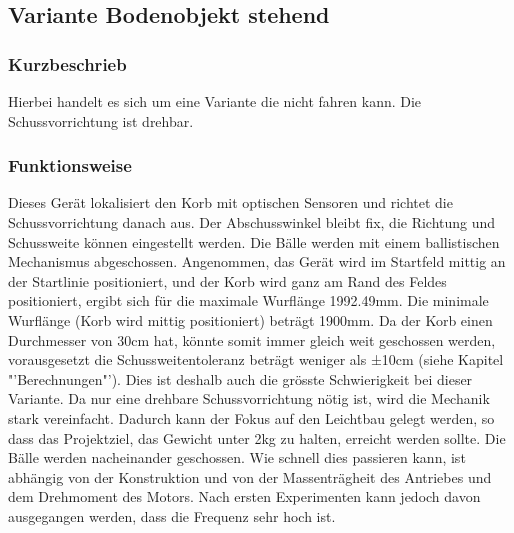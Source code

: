 

\clearpage

\subsection{Variante Bodenobjekt stehend}
\label{sec:var_bod_ste}
\subsubsection{Kurzbeschrieb}
Hierbei handelt es sich um eine Variante die nicht fahren kann. Die Schussvorrichtung ist drehbar.

\subsubsection{Funktionsweise}
Dieses Gerät lokalisiert den Korb mit optischen Sensoren und richtet die 
Schussvorrichtung danach aus. Der Abschusswinkel bleibt fix, die Richtung und 
Schussweite können eingestellt werden. Die Bälle werden mit einem 
ballistischen Mechanismus abgeschossen. Angenommen, das Gerät wird im Startfeld 
mittig an der Startlinie positioniert, und der Korb wird ganz am Rand des 
Feldes positioniert, ergibt sich für die maximale Wurflänge 1992.49mm. Die 
minimale Wurflänge (Korb wird mittig positioniert) beträgt 1900mm. Da der Korb 
einen Durchmesser von 30cm hat, könnte somit immer gleich weit geschossen 
werden, vorausgesetzt die Schussweitentoleranz beträgt weniger als ±10cm 
(siehe Kapitel "'Berechnungen"'). Dies ist deshalb auch die grösste 
Schwierigkeit bei dieser Variante. Da nur eine drehbare Schussvorrichtung nötig 
ist, wird die Mechanik stark vereinfacht. Dadurch kann der Fokus auf den 
Leichtbau gelegt werden, so dass das Projektziel, das Gewicht unter 2kg zu 
halten, erreicht werden sollte. Die Bälle werden nacheinander geschossen. Wie 
schnell dies passieren kann, ist abhängig von der Konstruktion und von der 
Massenträgheit des Antriebes und dem Drehmoment des Motors. Nach ersten 
Experimenten kann jedoch davon ausgegangen werden, dass die Frequenz sehr hoch 
ist.

